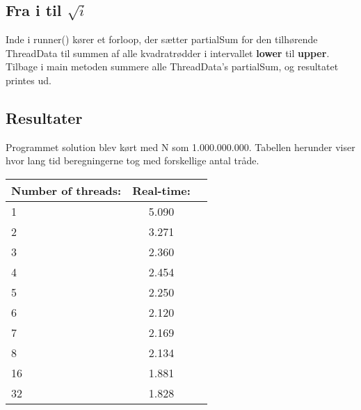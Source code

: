 \subsection{Fra i til $\sqrt{i}$}
Inde i runner() kører et forloop, der sætter partialSum for den tilhørende ThreadData til summen af alle kvadratrødder i intervallet \textbf{lower} til \textbf{upper}. Tilbage i main metoden summere alle ThreadData's partialSum, og resultatet printes ud.

\subsection{Resultater}
Programmet solution blev kørt med N som 1.000.000.000. Tabellen herunder viser hvor lang tid beregningerne tog med forskellige antal tråde.

\begin{center}
  \begin{tabular}{ | l | c | r | }
    \hline
    \textbf{Number of threads:} & \textbf{Real-time:} \\ \hline
    1 & 5.090 \\ \hline
	2 & 3.271 \\ \hline
	3 & 2.360 \\ \hline
	4 & 2.454 \\ \hline
	5 & 2.250 \\ \hline
	6 & 2.120 \\ \hline
	7 & 2.169 \\ \hline
	8 & 2.134 \\ \hline
	16 & 1.881 \\ \hline
	32 & 1.828 \\ \hline
  \end{tabular}
\end{center}